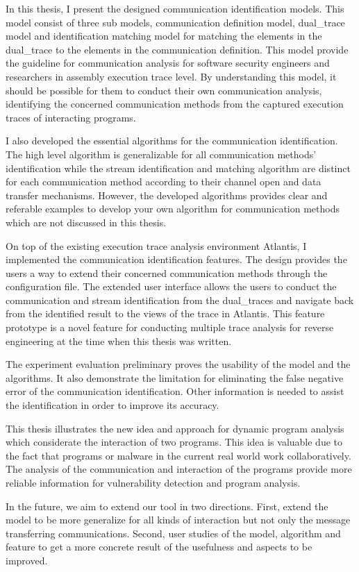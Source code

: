 \label{concl}
In this thesis, I present the designed communication identification models. This model consist of three sub models, communication definition model, dual\_trace model and identification matching model for matching the elements in the dual\_trace to the elements in the communication definition. This model provide the guideline for communication analysis for software security engineers and researchers in assembly execution trace level. By understanding this model, it should be possible for them to conduct their own communication analysis, identifying the concerned communication methods from the captured execution traces of interacting programs.

I also developed the essential algorithms for the communication identification. The high level algorithm is generalizable for all communication methods' identification while  the stream identification and matching algorithm are distinct for each communication method according to their channel open and data transfer mechanisms. However, the developed algorithms provides clear and referable examples to develop your own algorithm for communication methods which are not discussed in this thesis.

On top of the existing execution trace analysis environment Atlantis, I implemented the communication identification features. The design provides the users a way to extend their concerned communication methods through the configuration file. The extended user interface allows the users to conduct the communication and stream identification from the dual\_traces and navigate back from the identified result to the views of the trace in Atlantis. This feature prototype is a novel feature for conducting multiple trace analysis for reverse engineering at the time when this thesis was written. 

The experiment evaluation preliminary proves the usability of the model and the algorithms. It also demonstrate the limitation for eliminating the false negative error of the communication identification. Other information is needed to assist the identification in order to improve its accuracy.

This thesis illustrates the new idea and approach for dynamic program analysis which considerate the interaction of two programs. This idea is valuable due to the fact that programs or malware  in the current real world work collaboratively. The analysis of the communication and interaction of the programs provide more reliable information for vulnerability detection and program analysis.

In the future, we aim to extend our tool in two directions. First, extend the model to be more generalize for all kinds of interaction but not only the message transferring communications. Second, user studies of the model, algorithm and feature to get a more concrete result of the usefulness and aspects to be improved.

